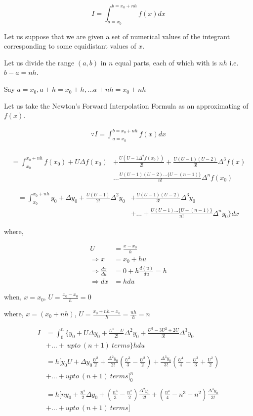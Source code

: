 \documentclass[11pt, a4paper]{article}
\begin{document}
\begin{equation*}
  I=\int_{a=x_0}^{b=x_0+nh}f(x)dx
\end{equation*}

Let us suppose that we are given a set of numerical values of the integrant
corresponding to some equidistant values of $x$.

Let us divide the range $(a,b)$ in $n$ equal parts, each of which with is $nh$
i.e. $b-a=nh$.

Say $a=x_0, a+h=x_0+h,\dots a+nh=x_0+nh$

Let us take the Newton's Forward Interpolation Formula as an approximating of $f(x)$.

\begin{align*}
  \because I=\int_{a=x_0}^{b=x_0+nh}f(x)dx\\
\end{align*}

\begin{align*}
=\int_{x_0}^{x_0+nh}f(x_0)+U\Delta f(x_0) &+\frac{U(U-1\Delta^2f(x_0))}{2!}+\frac{U(U-1)(U-2)}{3!}\Delta^3f(x)\\
& \dots\frac{U(U-1)(U-2)\dots\{U-(n-1)\}}{n!}\Delta^nf(x_0)
\end{align*}

\begin{align*}
=\int_{x_0}^{x_0+nh}y_0+\Delta y_0+\frac{U(U-1)}{2!}\Delta^2y_0 &+ \frac{U(U-1)(U-2)}{3!}\Delta^3y_0\\
&+ \dots+\frac{U(U-1)\dots\{U-(n-1)\}}{n!}\Delta^ny_0\}dx
\end{align*}

where,

\begin{align*}
              U &= \frac{x-x_0}{h}\\
  \Rightarrow x &= x_0+hu\\
  \Rightarrow \frac{dx}{du} &= 0+h\frac{d(u)}{du}=h\\
  \Rightarrow dx &= hdu
\end{align*}

when, $x=x_0$, $U=\frac{x_0-x_0}{h}=0$

where, $x=(x_0+nh)$, $U=\frac{x_0+nh-x_0}{h}=\frac{nh}{h}=n$

\begin{align*}
  I &= \int_{0}^{n}\{y_0+U\Delta y_0+\frac{U^2-U}{2!}\Delta^2y_0+\frac{U^3-3U^2+2U}{3!}\Delta^3y_0\\
    &+ \dots +\ upto\ (n+1)\ terms\} hdu\\
    \ \\
    &= h[y_0U+\Delta y_0\frac{U^2}{2}+\frac{\Delta^2y_0}{2!}(\frac{U^3}{3}-\frac{U^2}{2})+\frac{\Delta^3y_0}{3!}(\frac{U^4}{4}-\frac{U^3}{3}+\frac{U^2}{2})\\
    &+ \dots+upto\ (n+1)\ terms]_{0}^{n}\\
    \ \\
    &= h[ny_0+\frac{n^2}{2}\Delta y_0+(\frac{n^3}{3}-\frac{n^2}{2})\frac{\Delta^2y_0}{2!}+(\frac{n^4}{4}-n^3-n^2)\frac{\Delta^3y_0}{3!}\\
    &+ \dots+upto\ (n+1)\ terms]
\end{align*}
\end{document}

